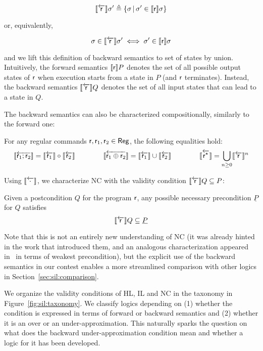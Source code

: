 \begin{equation}
	\llbracket\overleftarrow{\mathsf{r}}\rrbracket \sigma' \triangleq \{ \sigma \,\vert\, \sigma' \in \llbracket\mathsf{r}\rrbracket \sigma \} \label{eq:sil:bwsem-definition}
\end{equation}

\noindent or, equivalently,

\begin{equation}
	\sigma \in \llbracket\overleftarrow{\mathsf{r}}\rrbracket \sigma' \iff \sigma' \in \llbracket\mathsf{r}\rrbracket \sigma  \label{eq:sil:bwsem-sigma-sigma'}
\end{equation}

\noindent and we lift this definition of backward semantics to set of states by union.
Intuitively, the forward semantics $\llbracket\mathsf{r}\rrbracket P$ denotes the set of all possible output states of $\mathsf{r}$ when execution starts from a state in $P$ (and $\mathsf{r}$ terminates).
Instead, the backward semantics $\llbracket\overleftarrow{\mathsf{r}}\rrbracket Q$ denotes the set of all input states that can lead to a state in $Q$.

The backward semantics can also be characterized compositionally, similarly to the forward one:

\begin{lemma}\label{lmm:sil:bwsem-calculus}
	For any regular commands $\mathsf{r},\mathsf{r}_1,\mathsf{r}_2\in \mathsf{Reg}$, the following equalities hold:
	\[
	\llbracket\overleftarrow{\mathsf{r}_1; \mathsf{r}_2}\rrbracket = \llbracket\overleftarrow{\mathsf{r}_1}\rrbracket \circ \llbracket\overleftarrow{\mathsf{r}_2}\rrbracket \qquad\qquad
	\llbracket\overleftarrow{\mathsf{r}_1 \oplus \mathsf{r}_2}\rrbracket = \llbracket\overleftarrow{\mathsf{r}_1}\rrbracket \cup \llbracket\overleftarrow{\mathsf{r}_2}\rrbracket \qquad\qquad
	\llbracket\overleftarrow{{\mathsf{r}^\star}}\rrbracket = \bigcup\limits_{n \ge 0} \llbracket\overleftarrow{\mathsf{r}}\rrbracket^n
	\]
\end{lemma}

Using $\llbracket\overleftarrow{\cdot}\rrbracket$, we characterize NC with the validity condition $\llbracket\overleftarrow{\mathsf{r}}\rrbracket Q \subseteq P$:

\begin{prop}\label{prop:sil:nc}
	Given a postcondition $Q$ for the program $\mathsf{r}$, any possible necessary precondition $\underline{P}$ for $Q$ satisfies
	\[
	\llbracket\overleftarrow{\mathsf{r}}\rrbracket Q \subseteq \underline{P}
	\]
\end{prop}

Note that this is not an entirely new understanding of NC (it was already hinted in the work that introduced them, and an analogous characterization appeared in~\cite[§6.3]{ZK22} in terms of weakest precondition), but the explicit use of the backward semantics in our contest enables a more streamlined comparison with other logics in Section~\ref{sec:sil:comparison}.

We organize the validity conditions of HL, IL and NC in the taxonomy in Figure~\ref{fig:sil:taxonomy}. We classify logics depending on (1) whether the condition is expressed in terms of forward or backward semantics and (2) whether it is an over or an under-approximation.
This naturally sparks the question on what does the backward under-approximation condition mean and whether a logic for it has been developed.

